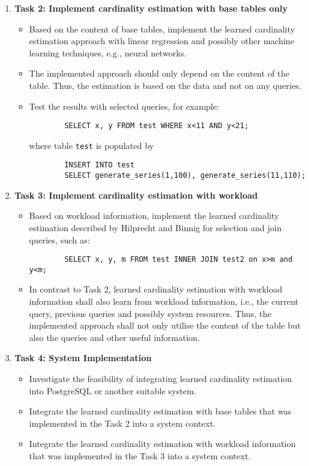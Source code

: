 \documentclass[english]{IFIletter}
\begin{document}
\begin{letter}
\begin{enumerate}
\item \textbf{Task 2: Implement cardinality estimation with base
    tables only}
  \begin{itemize}
  \item Based on the content of base tables, implement the learned
    cardinality estimation approach with linear regression and
    possibly other machine learning techniques, e.g., neural networks.
  \item The implemented approach should only depend on the content of
    the table.  Thus, the estimation is based on the data and not on
    any queries.
  \item Test the results with selected queries, for example:
     \begin{verbatim}
     	SELECT x, y FROM test WHERE x<11 AND y<21;
     \end{verbatim}
   \vspace{-15pt}
   where table \texttt{test} is populated by
     \begin{verbatim}
     	INSERT INTO test 
     	SELECT generate_series(1,100), generate_series(11,110);
    \end{verbatim}
   \vspace{-15pt}
 \end{itemize}

\item \textbf{Task 3: Implement cardinality estimation with workload}
  \begin{itemize}
  \item Based on workload information, implement the learned
    cardinality estimation described by Hilprecht and Binnig
    \cite{DBLP:journals/corr/abs-2105-00642} for selection and join
    queries, such as:
      \begin{verbatim}
      	SELECT x, y, m FROM test INNER JOIN test2 on x>m and y<m;
      \end{verbatim}
    \vspace{-15pt}
  \item In contrast to Task 2, learned cardinality estimation with
    workload information shall also learn from workload information,
    i.e., the current query, previous queries and possibly system
    resources.  Thus, the implemented approach shall not only utilise
    the content of the table but also the queries and other useful
    information.
  \end{itemize}

\item \textbf{Task 4: System Implementation}
  \begin{itemize}
  \item Investigate the feasibility of integrating learned cardinality
    estimation into PostgreSQL or another suitable system.
  \item Integrate the learned cardinality estimation with base tables
    that was implemented in the Task 2 into a system context.
  \item Integrate the learned cardinality estimation with workload
    information that was implemented in the Task 3 into a system
    context.
  \end{itemize}


\end{enumerate}
\end{letter}
\end{document}

